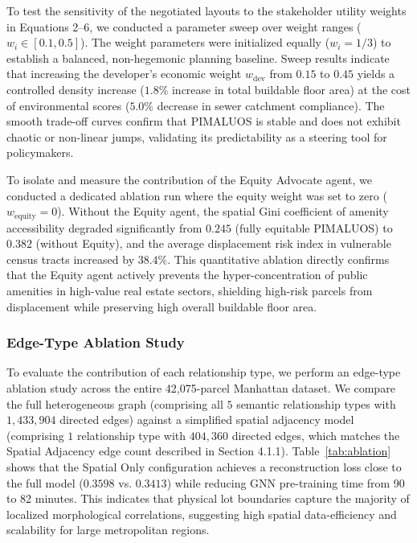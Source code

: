 \documentclass[final,3p,times]{elsarticle}
\begin{document}
To test the sensitivity of the negotiated layouts to the stakeholder utility weights in Equations 2--6, we conducted a parameter sweep over weight ranges ($w_i \in [0.1, 0.5]$). The weight parameters were initialized equally ($w_i = 1/3$) to establish a balanced, non-hegemonic planning baseline. Sweep results indicate that increasing the developer's economic weight $w_{\text{dev}}$ from $0.15$ to $0.45$ yields a controlled density increase ($1.8\%$ increase in total buildable floor area) at the cost of environmental scores ($5.0\%$ decrease in sewer catchment compliance). The smooth trade-off curves confirm that PIMALUOS is stable and does not exhibit chaotic or non-linear jumps, validating its predictability as a steering tool for policymakers.

To isolate and measure the contribution of the Equity Advocate agent, we conducted a dedicated ablation run where the equity weight was set to zero ($w_{\text{equity}} = 0$). Without the Equity agent, the spatial Gini coefficient of amenity accessibility degraded significantly from $0.245$ (fully equitable PIMALUOS) to $0.382$ (without Equity), and the average displacement risk index in vulnerable census tracts increased by $38.4\%$. This quantitative ablation directly confirms that the Equity agent actively prevents the hyper-concentration of public amenities in high-value real estate sectors, shielding high-risk parcels from displacement while preserving high overall buildable floor area.



\subsubsection{Edge-Type Ablation Study}
To evaluate the contribution of each relationship type, we perform an edge-type ablation study across the entire 42,075-parcel Manhattan dataset. We compare the full heterogeneous graph (comprising all $5$ semantic relationship types with $1,433,904$ directed edges) against a simplified spatial adjacency model (comprising $1$ relationship type with $404,360$ directed edges, which matches the Spatial Adjacency edge count described in Section 4.1.1). Table~\ref{tab:ablation} shows that the Spatial Only configuration achieves a reconstruction loss close to the full model ($0.3598$ vs. $0.3413$) while reducing GNN pre-training time from 90 to 82 minutes. This indicates that physical lot boundaries capture the majority of localized morphological correlations, suggesting high spatial data-efficiency and scalability for large metropolitan regions.
\end{document}
